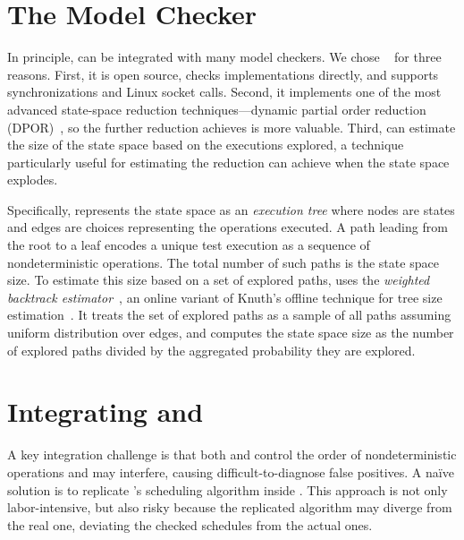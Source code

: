 \section{The \dbug Model Checker} \label{sec:dbug}

In principle, \parrot can be integrated with many model checkers.  We chose
\dbug~\cite{dbug:spin11} for three reasons.  First, it is 
open source, checks implementations directly, and 
supports \pthread synchronizations and Linux 
socket calls.  Second, it implements one of the
most advanced state-space reduction techniques---dynamic partial order
reduction (DPOR)~\cite{flanagan:dynamicpo}, so the further reduction \parrot
achieves is more valuable.  Third, \dbug can estimate the size of the
state space based on the executions explored, a technique particularly
useful for estimating the reduction \parrot can achieve when
the state space explodes.

Specifically, \dbug represents the state space as an \emph{execution tree}
where nodes are states and edges are choices representing the operations
executed.  A path leading from the root to a leaf encodes a unique test
execution as a sequence of nondeterministic operations.  The total number
of such paths is the state space size.  To estimate this size based on
a set of explored paths, \dbug uses the \emph{weighted backtrack
  estimator}~\cite{Kilby2006}, an online variant of Knuth's offline
technique for tree size estimation~\cite{Knuth1975}.  It treats the set of
explored paths as a sample of all paths assuming uniform distribution over
edges, and computes the state space size as the number of explored
paths divided by the aggregated probability they are explored.

\section{Integrating \parrot and \dbug} \label{sec:smt+mc}

A key integration challenge is that both \parrot and \dbug control the order
of nondeterministic operations and may interfere, causing
difficult-to-diagnose false positives.  A na\"{i}ve solution
is to replicate \parrot's scheduling algorithm inside \dbug.  This
approach is not only labor-intensive, but also risky because the
replicated algorithm may diverge from the real one, deviating the checked
schedules from the actual ones.

